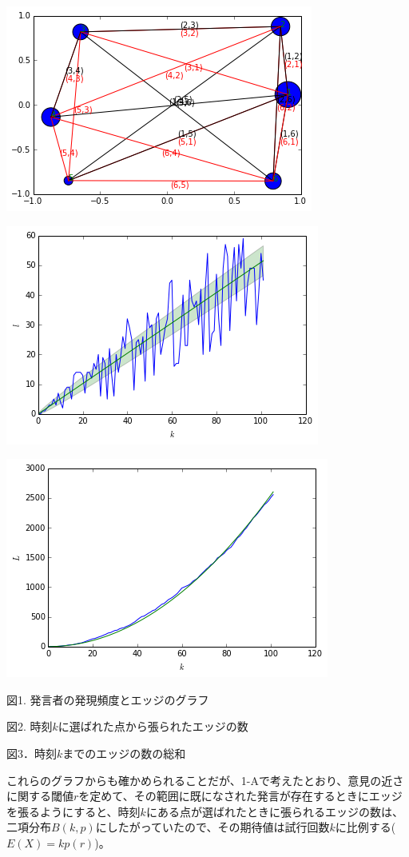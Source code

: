\documentclass[letterpaper,10pt,english]{sphinxmanual}
\begin{document}
\includegraphics{output_39_2.png}

\includegraphics{output_39_3.png}

\includegraphics{output_39_4.png}

図1. 発言者の発現頻度とエッジのグラフ

図2. 時刻\(k\)に選ばれた点から張られたエッジの数

図3．時刻\(k\)までのエッジの数の総和

これらのグラフからも確かめられることだが、1-Aで考えたとおり、意見の近さに関する閾値\(r\)を定めて、その範囲に既になされた発言が存在するときにエッジを張るようにすると、時刻\(k\)にある点が選ばれたときに張られるエッジの数は、二項分布\(B(k, p)\)にしたがっていたので、その期待値は試行回数\(k\)に比例する(\(E(X) = kp(r)\))。
\end{document}
